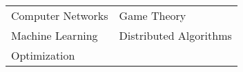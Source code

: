 \begin{tabular}{ll}
  Computer Networks               &Game Theory \\
  Machine Learning                &Distributed Algorithms \\
  Optimization \\
\end{tabular}
\medskip
